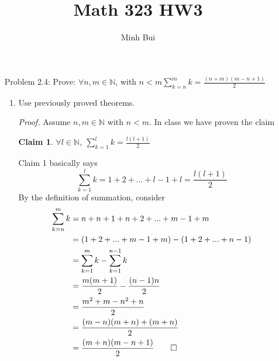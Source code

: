 \documentclass{article}
\author{Minh Bui}
\title{Math 323 HW3}
\newtheorem{claim}{Claim}
\begin{document}
\maketitle
\begin{enumerate}
    \item[Problem 2.4:] Prove: $\forall n, m \in \mathbb{N}$, with $n < m \sum\limits_{k=n}^{m} k = \frac{(n+m)(m-n+1)}{2}$
        \begin{enumerate}
            \item Use previously proved theorems.
            \item[] \emph{Proof.} Assume $n, m \in \mathbb{N}$ with $n < m$.
                In class we have proven the claim
                \begin{claim}
                    $\forall l \in \mathbb{N}$, $\sum\limits_{k=1}^l k = \frac{l(l+1)}{2}$
                \end{claim}
                Claim 1 basically says
                \begin{equation*}
                    \sum\limits_{k=1}^l k = 1 + 2 + ... + l - 1 + l = \frac{l(l+1)}{2}
                \end{equation*}
                By the definition of summation, consider
                \begin{align*}
                    \sum\limits_{k=n}^m k &= n + n + 1 + n + 2 + ... + m - 1 + m\\
                    &= (1 + 2 + ... + m - 1 + m) - (1 + 2 + ... + n - 1)\\
                    &= \sum\limits_{k=1}^m k - \sum\limits_{k=1}^{n-1} k\\
                    &= \frac{m(m+1)}{2} - \frac{(n-1)n}{2}\\
                    &= \frac{m^2 + m - n^2 + n}{2}\\
                    &= \frac{(m - n)(m + n) + (m + n)}{2}\\
                    &= \frac{(m + n)(m - n  + 1)}{2} \qed
                \end{align*}


\end{enumerate}
\end{enumerate}
\end{document}
